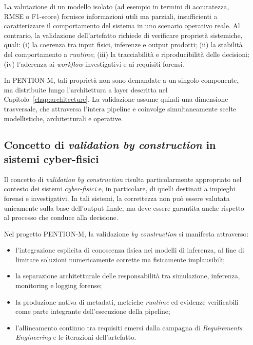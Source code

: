 La valutazione di un modello isolato (ad esempio in termini di accuratezza, RMSE o F1-score) fornisce informazioni utili ma parziali, insufficienti a caratterizzare il comportamento del sistema in uno scenario operativo reale.
Al contrario, la validazione dell’artefatto richiede di verificare proprietà sistemiche, quali:
(i) la coerenza tra input fisici, inferenze e output prodotti;
(ii) la stabilità del comportamento a \textit{runtime};
(iii) la tracciabilità e riproducibilità delle decisioni;
(iv) l’aderenza ai \textit{workflow} investigativi e ai requisiti forensi.

In \textsc{PENTION-M}, tali proprietà non sono demandate a un singolo componente, ma distribuite lungo l’architettura a layer descritta nel Capitolo~\ref{chap:architecture}.
La validazione assume quindi una dimensione trasversale, che attraversa l’intera pipeline e coinvolge simultaneamente scelte modellistiche, architetturali e operative.

\subsection*{Concetto di \emph{validation by construction} in sistemi cyber-fisici}

Il concetto di \emph{validation by construction} risulta particolarmente appropriato nel contesto dei sistemi \textit{cyber-fisici} e, in particolare, di quelli destinati a impieghi forensi e investigativi.
In tali sistemi, la correttezza non può essere valutata unicamente sulla base dell’output finale, ma deve essere garantita anche rispetto al processo che conduce alla decisione.

Nel progetto \textsc{PENTION-M}, la validazione \textit{by construction} si manifesta attraverso:
\begin{itemize}
    \item l’integrazione esplicita di conoscenza fisica nei modelli di inferenza, al fine di limitare soluzioni numericamente corrette ma fisicamente implausibili;
    \item la separazione architetturale delle responsabilità tra simulazione, inferenza, monitoring e logging forense;
    \item la produzione nativa di metadati, metriche \textit{runtime} ed evidenze verificabili come parte integrante dell’esecuzione della pipeline;
    \item l’allineamento continuo tra requisiti emersi dalla campagna di \emph{Requirements Engineering} e le iterazioni dell’artefatto.
\end{itemize}

